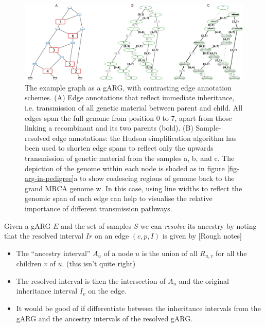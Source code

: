\documentclass{article}
\begin{document}
\begin{figure}
\centering
\includegraphics[width=\textwidth]{illustrations/ancestry-resolution}
\caption{\label{fig-ancestry-resolution}
The \citet[][fig. 1]{wiuf1999recombination} example graph as a gARG, with contrasting
edge annotation schemes.
(A) Edge annotations that reflect immediate inheritance, i.e. transmission of all
genetic material between parent and child. All edges span the full genome from position 0 to 7,
apart from those linking a recombinant and its two parents (bold).
(B) Sample-resolved edge annotations: the Hudson simplification algorithm has been used to
shorten edge spans to reflect only the upwards transmission of genetic
material from the samples \textsf{a}, \textsf{b}, and \textsf{c}. The depiction of the genome within
each node is shaded as in figure \ref{fig-arg-in-pedigree}a to show
coalescing regions of genome back to the grand MRCA genome \textsf{w}.
In this case, using line widths to reflect the genomic span of each edge can
help to visualise the relative importance of different transmission pathways.
}
\end{figure}


Given a gARG $E$ and the set of samples $S$ we can \emph{resolve} its
ancestry by noting that the resolved interval $Ir$ on an edge $(c,p,I)$
is given by [Rough notes]

\begin{itemize}
\item The ``ancestry interval'' $A_u$ of a node $u$ is the union of
all $R_{u, v}$ for all the children $v$ of $u$. (this isn't quite right)
\item The resolved interval is then the intersection of $A_u$ and the
original inheritance interval $I_v$ on the edge.
\item It would be good of if differentiate between the inheritance intervals
 from the gARG and the ancestry intervals of the resolved gARG.
\end{itemize}
\end{document}
